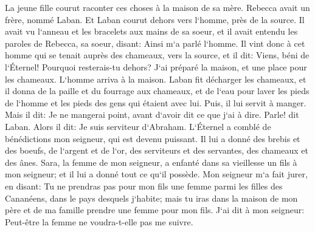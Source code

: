 \verse La jeune fille courut raconter ces choses à la maison de sa mère. 
\verse Rebecca avait un frère, nommé Laban. Et Laban courut dehors vers l`homme, près de la source. 
\verse Il avait vu l`anneau et les bracelets aux mains de sa soeur, et il avait entendu les paroles de Rebecca, sa soeur, disant: Ainsi m`a parlé l`homme. Il vint donc à cet homme qui se tenait auprès des chameaux, vers la source, 
\verse et il dit: Viens, béni de l`Éternel! Pourquoi resterais-tu dehors? J`ai préparé la maison, et une place pour les chameaux. 
\verse L`homme arriva à la maison. Laban fit décharger les chameaux, et il donna de la paille et du fourrage aux chameaux, et de l`eau pour laver les pieds de l`homme et les pieds des gens qui étaient avec lui. 
\verse Puis, il lui servit à manger. Mais il dit: Je ne mangerai point, avant d`avoir dit ce que j`ai à dire. Parle! dit Laban. 
\verse Alors il dit: Je suis serviteur d`Abraham. 
\verse L`Éternel a comblé de bénédictions mon seigneur, qui est devenu puissant. Il lui a donné des brebis et des boeufs, de l`argent et de l`or, des serviteurs et des servantes, des chameaux et des ânes. 
\verse Sara, la femme de mon seigneur, a enfanté dans sa vieillesse un fils à mon seigneur; et il lui a donné tout ce qu`il possède. 
\verse Mon seigneur m`a fait jurer, en disant: Tu ne prendras pas pour mon fils une femme parmi les filles des Cananéens, dans le pays desquels j`habite; 
\verse mais tu iras dans la maison de mon père et de ma famille prendre une femme pour mon fils. 
\verse J`ai dit à mon seigneur: Peut-être la femme ne voudra-t-elle pas me suivre. 

